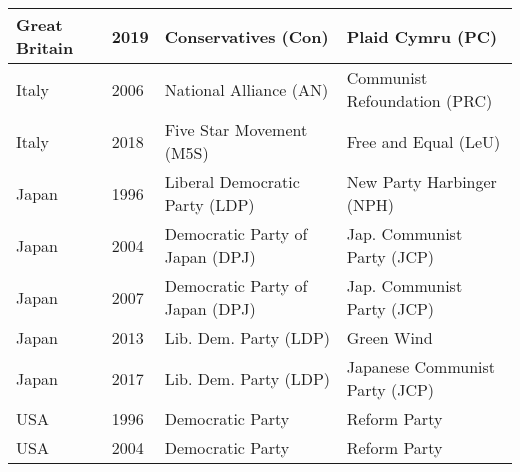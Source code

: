 \begin{table}
{\begin{tabular}{llll}
  Great Britain & 2019 &   Conservatives (Con) &   Plaid Cymru (PC)   \\ \midrule
 Italy & 2006 &   National Alliance (AN)   &   Communist Refoundation (PRC) \\ 
  Italy & 2018 &   Five Star Movement (M5S) &   Free and Equal (LeU) \\ \midrule
  Japan & 1996 &   Liberal Democratic Party (LDP) &   New Party Harbinger (NPH) \\ 
  Japan & 2004 &   Democratic Party of Japan (DPJ)   &   Jap. Communist Party (JCP) \\ 
  Japan & 2007 &   Democratic Party of Japan (DPJ)   &   Jap. Communist Party (JCP) \\ 
  Japan & 2013 &   Lib. Dem. Party (LDP) &   Green Wind \\ 
  Japan & 2017 &   Lib. Dem. Party (LDP) &   Japanese Communist Party (JCP) \\ \midrule
  USA & 1996 & Democratic Party & Reform Party \\
  USA & 2004 & Democratic Party & Reform Party \\ 
\bottomrule
\end{tabular}	}
\label{tab.g7}
\end{table}